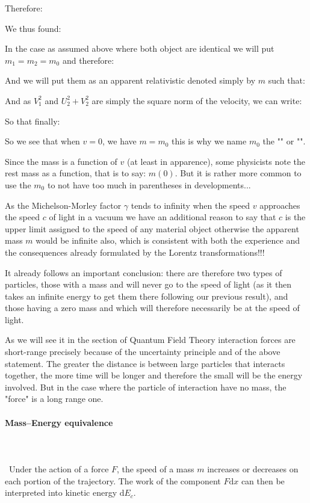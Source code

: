	Therefore:
	
	We thus found:
	
	In the case as assumed above where both object are identical we will put $m_1=m_2=m_0$ and therefore:
	
	And we will put them as an apparent relativistic denoted simply by $m$ such that:
	
	And as $V_1^2$ and $U_2^2+V_2^2$ are simply the square norm of the velocity, we can write:
	
	So that finally:
	
	So we see that when $v=0$, we have $m=m_0$ this is why we name $m_0$ the "" or "".
	
	Since the mass is a function of $v$ (at least in apparence), some physicists note the rest mass as a function, that is to say: $m(0)$. But it is rather more common to use the $m_0$ to not have too much in parentheses in developments...
	
	As the Michelson-Morley factor $\gamma$ tends to infinity when the speed $v$ approaches the speed $c$ of light in a vacuum we have an additional reason to say that $c$ is the upper limit assigned to the speed of any material object otherwise the apparent mass $m$ would be infinite also, which is consistent with both the experience and the consequences already formulated by the Lorentz transformations!!!
	
	It already follows an important conclusion: there are therefore two types of particles, those with a mass and will never go to the speed of light (as it then takes an infinite energy to get them there following our previous result), and those having a zero mass and which will therefore necessarily be at the speed of light.
	
	As we will see it in the section of Quantum Field Theory interaction forces are short-range precisely because of the uncertainty principle and of the above statement. The greater the distance is between large particles that interacts together, the more time will be longer and therefore the small will be the energy involved. But in the case where the particle of interaction have no mass, the "force" is a long range one.
	
	\pagebreak
	\paragraph{Mass–Energy equivalence}\label{mass energy equivalence}\mbox{}\\\\\
	Under the action of a force $F$, the speed of a mass $m$ increases or decreases on each portion of the trajectory. The work of the component $F\mathrm{d}x$  can then be interpreted into kinetic energy $\mathrm{d}E_c$.

